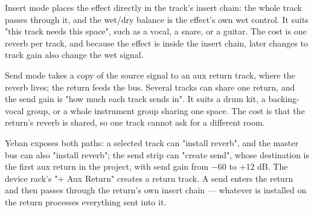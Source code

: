\begin{center}
\end{center}

Insert mode places the effect directly in the track's insert chain: the whole track passes through it, and the wet/dry balance is the effect's own wet control. It suits "this track needs this space", such as a vocal, a snare, or a guitar. The cost is one reverb per track, and because the effect is inside the insert chain, later changes to track gain also change the wet signal.

Send mode takes a copy of the source signal to an aux return track, where the reverb lives; the return feeds the bus. Several tracks can share one return, and the send gain is "how much each track sends in". It suits a drum kit, a backing-vocal group, or a whole instrument group sharing one space. The cost is that the return's reverb is shared, so one track cannot ask for a different room.

Yeban exposes both paths: a selected track can "install reverb", and the master bus can also "install reverb"; the send strip can "create send", whose destination is the first aux return in the project, with send gain from −60 to +12 dB. The device rack's "+ Aux Return" creates a return track. A send enters the return and then passes through the return's own insert chain — whatever is installed on the return processes everything sent into it.


